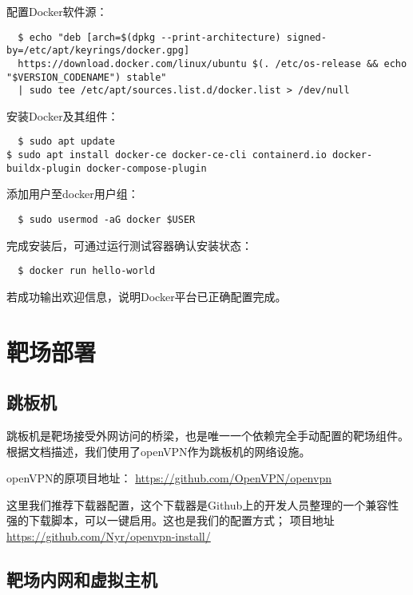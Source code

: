 \documentclass[lang=cn,10pt]{elegantbook}
\begin{document}
配置Docker软件源：

\begin{verbatim}
  $ echo "deb [arch=$(dpkg --print-architecture) signed-by=/etc/apt/keyrings/docker.gpg]
  https://download.docker.com/linux/ubuntu $(. /etc/os-release && echo "$VERSION_CODENAME") stable"
  | sudo tee /etc/apt/sources.list.d/docker.list > /dev/null
\end{verbatim}

安装Docker及其组件：

\begin{verbatim}
  $ sudo apt update
$ sudo apt install docker-ce docker-ce-cli containerd.io docker-buildx-plugin docker-compose-plugin
\end{verbatim}

添加用户至docker用户组：

\begin{verbatim}
  $ sudo usermod -aG docker $USER
\end{verbatim}

完成安装后，可通过运行测试容器确认安装状态：

\begin{verbatim}
  $ docker run hello-world
\end{verbatim}

若成功输出欢迎信息，说明Docker平台已正确配置完成。


\section{靶场部署}

\subsection{跳板机}

跳板机是靶场接受外网访问的桥梁，也是唯一一个依赖完全手动配置的靶场组件。根据文档描述，我们使用了openVPN作为跳板机的网络设施。

openVPN的原项目地址：
\href{https://github.com/OpenVPN/openvpn}{https://github.com/OpenVPN/openvpn}

这里我们推荐下载器配置，这个下载器是Github上的开发人员整理的一个兼容性强的下载脚本，可以一键启用。这也是我们的配置方式；
项目地址
\href{https://github.com/Nyr/openvpn-install/}{https://github.com/Nyr/openvpn-install/}



\subsection{靶场内网和虚拟主机}
\end{document}
